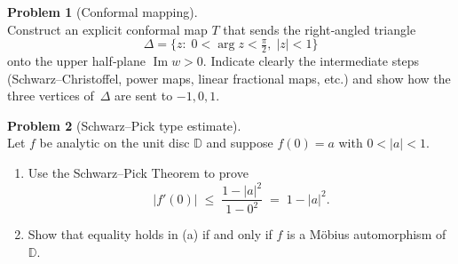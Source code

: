 \documentclass[12pt]{article}
\theoremstyle{definition} %
\newtheorem{problem}{Problem}
\theoremstyle{plain} %
\begin{document}
  \pagebreak
  \begin{problem}[Conformal mapping]\mbox{}\\[4pt]
  Construct an explicit conformal map \(T\) that sends the right‑angled triangle
  \[
    \Delta=\{z:\;0<\arg z<\tfrac{\pi}{2},\; \lvert z\rvert<1\}
  \]
  onto the upper half‑plane \(\operatorname{Im}w>0\).  
  Indicate clearly the intermediate steps (Schwarz–Christoffel, power maps, linear fractional maps, etc.) and show how the three vertices of $\Delta$ are sent to \(-1,0,1\).
  \end{problem}
  
  \pagebreak
  \begin{problem}[Schwarz–Pick type estimate]\mbox{}\\[4pt]
  Let \(f\) be analytic on the unit disc $\mathbb{D}$ and suppose $f(0)=a$ with $0<\lvert a\rvert<1$.
  \begin{enumerate}[label=(\alph*),itemsep=6pt]
    \item Use the Schwarz–Pick Theorem to prove
          \[
            \lvert f'(0)\rvert
            \;\le\;
            \frac{1-\lvert a\rvert^{2}}{1-0^{2}}
            \;=\;
            1-\lvert a\rvert^{2}.
          \]
    \item Show that equality holds in (a) if and only if $f$ is a Möbius automorphism of $\mathbb{D}$.
  \end{enumerate}
  \end{problem}
\end{document}
